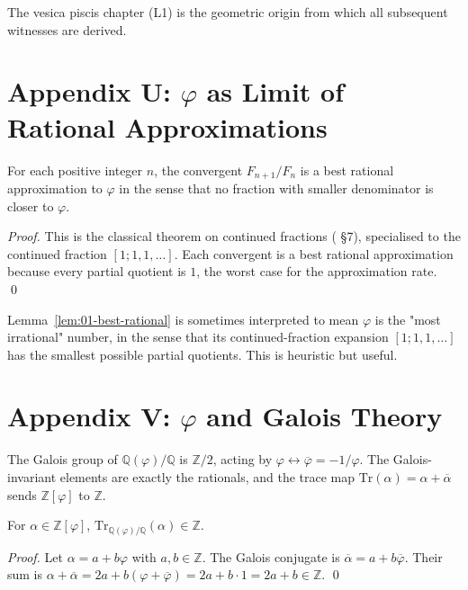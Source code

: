 The vesica piscis chapter (L1) is the geometric origin from which all
subsequent witnesses are derived.

\section*{Appendix U: $\varphi$ as Limit of Rational Approximations}
\label{sec:01-app-U}

\begin{lemma}
\label{lem:01-best-rational}
For each positive integer $n$, the convergent $F_{n+1}/F_n$ is a
best rational approximation to $\varphi$ in the sense that no
fraction with smaller denominator is closer to $\varphi$.
\end{lemma}

\begin{proof}
This is the classical theorem on continued fractions
(\cite{niven_irrational} \S 7), specialised to the continued fraction
$[1; 1, 1, \ldots]$. Each convergent is a best rational approximation
because every partial quotient is $1$, the worst case for the
approximation rate.
\qed
\end{proof}

\begin{remark}
Lemma~\ref{lem:01-best-rational} is sometimes interpreted to mean
$\varphi$ is the "most irrational" number, in the sense that its
continued-fraction expansion $[1; 1, 1, \ldots]$ has the smallest
possible partial quotients. This is heuristic but useful.
\end{remark}

\section*{Appendix V: $\varphi$ and Galois Theory}
\label{sec:01-app-V}

The Galois group of $\mathbb{Q}(\varphi)/\mathbb{Q}$ is $\mathbb{Z}/2$,
acting by $\varphi \leftrightarrow \overline{\varphi} = -1/\varphi$.
The Galois-invariant elements are exactly the rationals, and the
trace map $\mathrm{Tr}(\alpha) = \alpha + \overline{\alpha}$ sends
$\mathbb{Z}[\varphi]$ to $\mathbb{Z}$.

\begin{theorem}\label{thm:01-trace-as-Z}
For $\alpha \in \mathbb{Z}[\varphi]$, $\mathrm{Tr}_{
\mathbb{Q}(\varphi)/\mathbb{Q}}(\alpha) \in \mathbb{Z}$.
\end{theorem}

\begin{proof}
Let $\alpha = a + b \varphi$ with $a, b \in \mathbb{Z}$. The Galois
conjugate is $\overline{\alpha} = a + b \overline{\varphi}$. Their
sum is $\alpha + \overline{\alpha} = 2a + b (\varphi +
\overline{\varphi}) = 2a + b \cdot 1 = 2a + b \in \mathbb{Z}$.
\qed
\end{proof}

